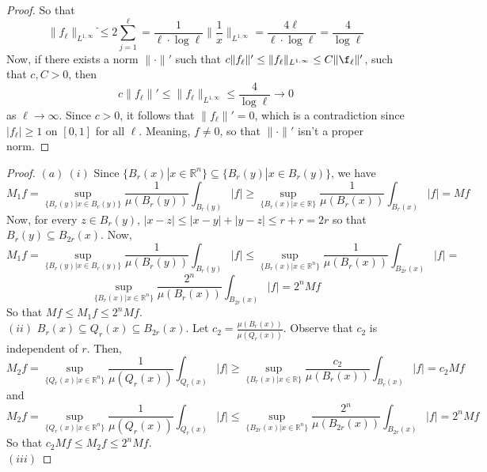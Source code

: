 \documentclass[12pt]{article}
\newenvironment{exercise}[2][Exercise]{\begin{trivlist}
\item[\hskip \labelsep {\bfseries #1}\hskip \labelsep {\bfseries #2.}]}{\end{trivlist}}
\begin{document}
\begin{proof}
  So that
  $$\|f_\ell\|_{L^{1, \infty}} ֿ\le 2 \sum_{j=1}^\ell = \frac{1}{\ell \cdot \log \ell} \|\frac{1}{x}\|_{L^{1, \infty}} = \frac{4 \ell}{\ell \cdot \log \ell} = \frac{4}{\log \ell}$$
  Now, if there exists a norm $\|\cdot\|'$ such that $c\|f_\ell\|' \le \|f_\ell\|_{L^{1, \infty}} \le C\|\f_\ell\|'$, such that $c,C > 0$, then
  $$c\|f_\ell\|' \le \|f_\ell\|_{L^{1, \infty}} \le \dfrac{4}{\log \ell} \rightarrow 0$$
  as $\ell \rightarrow \infty$. Since $c > 0$, it follows that $\|f_\ell\|' = 0$, which is a contradiction since $|f_\ell| \ge 1$ on $[0, 1]$ for all $\ell$. Meaning, $f \ne 0$, so  that $\|\cdot\|'$ isn't a proper  norm.
\end{proof}

\begin{exercise}{3}
\end{exercise}

\begin{proof}
  $(a)\ (i)$ Since $\{B_r(x) | x \in \mathbb{R}^n\} \subseteq \{B_r(y) | x  \in B_r(y)\}$, we have
  $$M_1f = \sup_{\{B_r(y) | x  \in B_r(y)\}} \dfrac{1}{\mu(B_r(y))} \int_{B_r(y)} |f| \ge \sup_{\{B_r(x) | x \in \mathbb{R}\}} \dfrac{1}{\mu(B_r(x))} \int_{B_r(x)} |f| = Mf$$
  Now, for every $z \in B_r(y)$, $|x - z| \le |x - y| + |y - z| \le r + r = 2r$ so that $B_r(y) \subseteq B_{2r}(x)$. Now,
  $$M_1f = \sup_{\{B_r(y) | x  \in B_r(y)\}} \dfrac{1}{\mu(B_r(y))} \int_{B_r(y)} |f| \le \sup_{\{B_r(x) | x  \in \mathbb{R}^n\}} \dfrac{1}{\mu(B_r(x))} \int_{B_{2r}(x)} |f| =$$ $$\sup_{\{B_r(x) | x  \in \mathbb{R}^n\}} \dfrac{2^n}{\mu(B_r(x))} \int_{B_{2r}(x)} |f| = 2^n Mf$$
  So that $Mf \le M_1f \le 2^n Mf$.\\
  $(ii)$ $B_r(x) \subseteq Q_r(x) \subseteq B_{2r}(x)$. Let $c_2 = \frac{\mu(B_r(x))}{\mu(Q_r(x))}$. Observe that $c_2$ is independent of $r$. Then,
  $$M_2f = \sup_{\{Q_r(x) | x  \in \mathbb{R}^n\}} \dfrac{1}{\mu(Q_r(x))} \int_{Q_r(x)} |f| \ge \sup_{\{B_r(x) | x \in \mathbb{R}\}} \dfrac{c_2}{\mu(B_r(x))} \int_{B_r(x)} |f| = c_2Mf$$
  and
  $$M_2f = \sup_{\{Q_r(x) | x  \in \mathbb{R}^n\}} \dfrac{1}{\mu(Q_r(x))} \int_{Q_r(x)} |f| \le \sup_{\{B_{2r}(x) | x  \in \mathbb{R}^n\}} \dfrac{2^n}{\mu(B_{2r}(x))} \int_{B_{2r}(x)} |f| = 2^n Mf$$
  So that $c_2Mf \le M_2f \le 2^n Mf$.\\
  $(iii)$
\end{proof}
\end{document}
